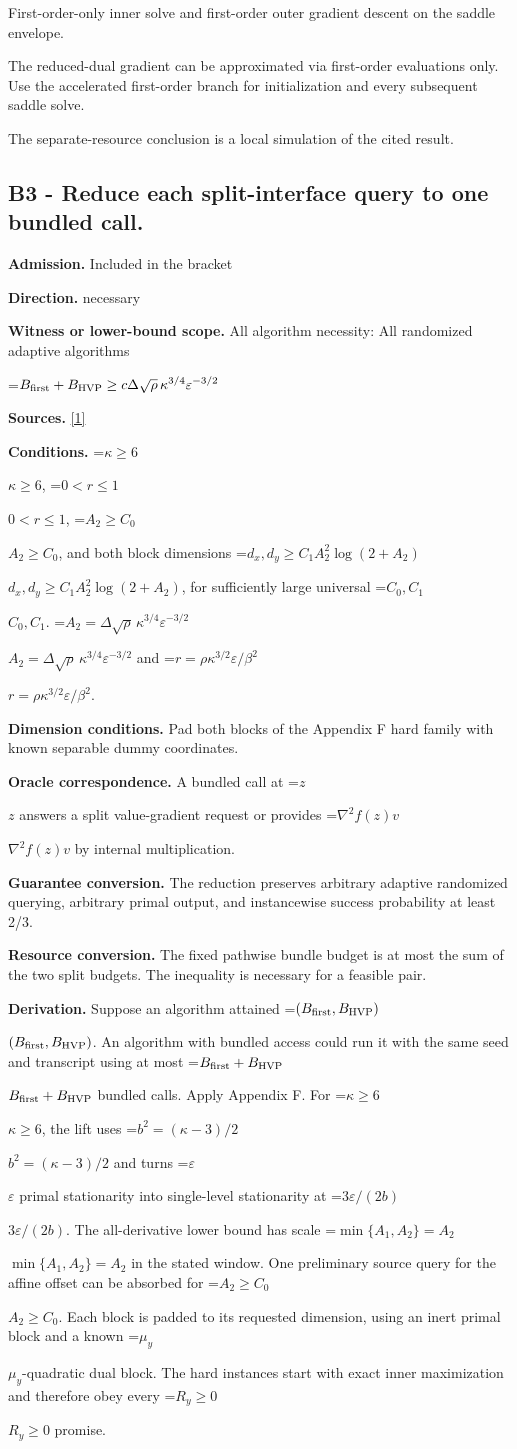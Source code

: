 \documentclass[10pt,a4paper]{article}
\newcommand{\AtlasMath}[1]{\par\begingroup\centering\setbox0=\hbox{$\displaystyle #1$}\ifdim\wd0>1.4\linewidth\typeout{ATLAS WIDE FORMULA: \the\wd0}\fi\ifdim\wd0>\linewidth\resizebox{\linewidth}{!}{\box0}\else\box0\fi\par\endgroup}
\newcommand{\AtlasInlineMath}[1]{\begingroup\setbox0=\hbox{$#1$}\ifdim\wd0>.4\linewidth\endgroup\AtlasMath{#1}\else\endgroup$#1$\fi}
\begin{document}
First-order-only inner solve and first-order outer gradient descent on the saddle envelope.

The reduced-dual gradient can be approximated via first-order evaluations only. Use the accelerated first-order branch for initialization and every subsequent saddle solve.

The separate-resource conclusion is a local simulation of the cited result.

\subsection{B3 - Reduce each split-interface query to one bundled call.}
\textbf{Admission.} Included in the bracket

\textbf{Direction.} necessary

\textbf{Witness or lower-bound scope.} All algorithm necessity: All randomized adaptive algorithms

\AtlasMath{B_{\rm first}+B_{\rm HVP}\ge c\Delta\sqrt\rho\,\kappa^{3/4}\varepsilon^{-3/2}}
\textbf{Sources.} \href{https://arxiv.org/pdf/2610.16771v2}{[1]}

\textbf{Conditions.} \AtlasInlineMath{\kappa\ge6}, \AtlasInlineMath{0<r\le1}, \AtlasInlineMath{A_2\ge C_0}, and both block dimensions \AtlasInlineMath{d_x,d_y\ge C_1 A_2^2\log(2+A_2)}, for sufficiently large universal \AtlasInlineMath{C_0,C_1}. \AtlasInlineMath{A_2=\Delta\sqrt\rho\,\kappa^{3/4}\varepsilon^{-3/2}} and \AtlasInlineMath{r=\rho\kappa^{3/2}\varepsilon/\beta^2}.

\textbf{Dimension conditions.} Pad both blocks of the Appendix F hard family with known separable dummy coordinates.

\textbf{Oracle correspondence.} A bundled call at \AtlasInlineMath{z} answers a split value-gradient request or provides \AtlasInlineMath{\nabla^2 f(z)v} by internal multiplication.

\textbf{Guarantee conversion.} The reduction preserves arbitrary adaptive randomized querying, arbitrary primal output, and instancewise success probability at least 2/3.

\textbf{Resource conversion.} The fixed pathwise bundle budget is at most the sum of the two split budgets. The inequality is necessary for a feasible pair.

\textbf{Derivation.} Suppose an algorithm attained \AtlasInlineMath{(B_{\rm first},B_{\rm HVP})}. An algorithm with bundled access could run it with the same seed and transcript using at most \AtlasInlineMath{B_{\rm first}+B_{\rm HVP}} bundled calls. Apply Appendix F. For \AtlasInlineMath{\kappa\ge6}, the lift uses \AtlasInlineMath{b^2=(\kappa-3)/2} and turns \AtlasInlineMath{\varepsilon} primal stationarity into single-level stationarity at \AtlasInlineMath{3\varepsilon/(2b)}. The all-derivative lower bound has scale \AtlasInlineMath{\min\{A_1,A_2\}=A_2} in the stated window. One preliminary source query for the affine offset can be absorbed for \AtlasInlineMath{A_2\ge C_0}. Each block is padded to its requested dimension, using an inert primal block and a known \AtlasInlineMath{\mu_y}-quadratic dual block. The hard instances start with exact inner maximization and therefore obey every \AtlasInlineMath{R_y\ge0} promise.
\end{document}
